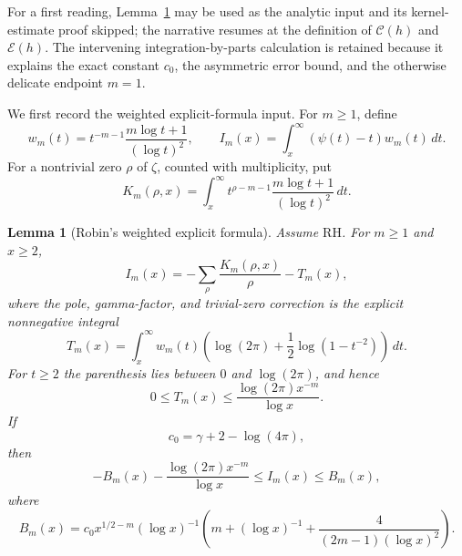 \documentclass[11pt]{amsart}
\newtheorem{lemma}[theorem]{Lemma}
\theoremstyle{definition}
\theoremstyle{remark}
\numberwithin{equation}{section}
\newcommand{\RH}{\mathrm{RH}}
\newcommand{\euler}{\gamma}
\newcommand{\E}{\mathcal{E}}
\newcommand{\Pcost}{\mathcal{C}}
\begin{document}
For a first reading, Lemma~\ref{lem:weighted-ef} may be used as the analytic
input and its kernel-estimate proof skipped; the narrative resumes at the
definition of $\Pcost(h)$ and $\E(h)$.  The intervening integration-by-parts
calculation is retained because it explains the exact constant $c_0$, the
asymmetric error bound, and the otherwise delicate endpoint $m=1$.

We first record the weighted explicit-formula input.  For $m\ge1$, define
\begin{equation}\label{eq:weight}
  w_m(t)=t^{-m-1}\frac{m\log t+1}{(\log t)^2},
  \qquad
  I_m(x)=\int_x^{\infty}(\psi(t)-t)w_m(t)\,dt.
\end{equation}
For a nontrivial zero $\rho$ of $\zeta$, counted with multiplicity, put
\[
  K_m(\rho,x)=\int_x^{\infty}
    t^{\rho-m-1}\frac{m\log t+1}{(\log t)^2}\,dt.
\]

\begin{lemma}[Robin's weighted explicit formula]\label{lem:weighted-ef}
Assume $\RH$.  For $m\ge1$ and $x\ge2$,
\begin{equation}\label{eq:weighted-ef}
  I_m(x)=-\sum_{\rho}\frac{K_m(\rho,x)}{\rho}-T_m(x),
\end{equation}
where the pole, gamma-factor, and trivial-zero correction is the explicit
nonnegative integral
\begin{equation}\label{eq:trivial-correction}
 T_m(x)=\int_x^\infty w_m(t)
 \left(\log(2\pi)+\frac12\log(1-t^{-2})\right)\,dt.
\end{equation}
For $t\ge2$ the parenthesis lies between $0$ and $\log(2\pi)$, and hence
\begin{equation}\label{eq:trivial-correction-bound}
 0\le T_m(x)\le
 \frac{\log(2\pi)x^{-m}}{\log x}.
\end{equation}
If
\[
  c_0=\euler+2-\log(4\pi),
\]
then
\begin{equation}\label{eq:weighted-bound}
 -B_m(x)-\frac{\log(2\pi)x^{-m}}{\log x}
 \le I_m(x)\le B_m(x),
\end{equation}
where
\begin{equation}\label{eq:Bmx}
 B_m(x)=c_0x^{1/2-m}(\log x)^{-1}
 \left(m+(\log x)^{-1}
 +\frac{4}{(2m-1)(\log x)^2}\right).
\end{equation}
\end{lemma}
\end{document}
